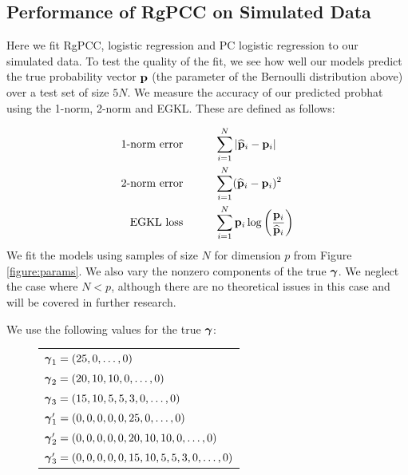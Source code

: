 \documentclass[main.tex]{subfiles}
\begin{document}
\subsection{Performance of RgPCC on Simulated Data}
Here we fit RgPCC, logistic regression and PC logistic regression to our simulated data. To test the quality of the fit, we see how well our models predict the true probability vector $\mathbf{p}$ (the parameter of the Bernoulli distribution above) over a test set of size $5N$. We measure the accuracy of our predicted \gls{probhat} using the 1-norm, 2-norm and EGKL. These are defined as follows:

\begin{align*}
	\text{1-norm error} & \hspace{1cm} \sum_{i = 1}^N |\widehat{\mathbf{p}}_i - \mathbf{p}_i| \\
	\text{2-norm error} & \hspace{1cm} \sum_{i = 1}^N (\widehat{\mathbf{p}}_i - \mathbf{p}_i)^2 \\
	\text{EGKL loss} & \hspace{1cm} \sum_{i = 1}^N \mathbf{p}_i \log \left ( \frac{\mathbf{p}_i}{\widehat{\mathbf{p}}_i} \right )
\end{align*}
We fit the models using samples of size $N$ for dimension $p$ from Figure \ref{figure:params}. We also vary the nonzero components of the true $\boldsymbol \gamma$. We neglect the case where $N < p$, although there are no theoretical issues in this case and will be covered in further research.

We use the following values for the true $\boldsymbol \gamma$:
\begin{figure}[H]
	\begin{tabular}{l}
		$\boldsymbol \gamma_1 = (25, 0, \ldots , 0)$ \\
		$\boldsymbol \gamma_2 = (20, 10, 10, 0, \ldots , 0)$ \\
		$\boldsymbol \gamma_3 = (15, 10, 5, 5, 3, 0, \ldots , 0)$\\
		$\boldsymbol \gamma_1' = (0, 0, 0, 0, 0, 25, 0, \ldots , 0)$ \\
		$\boldsymbol \gamma_2' = (0, 0, 0, 0, 0,  20, 10, 10, 0, \ldots , 0)$ \\
		$\boldsymbol \gamma_3' = (0, 0, 0, 0, 0,  15, 10, 5, 5, 3, 0, \ldots , 0)$
	\end{tabular}
\end{figure}
\end{document}
